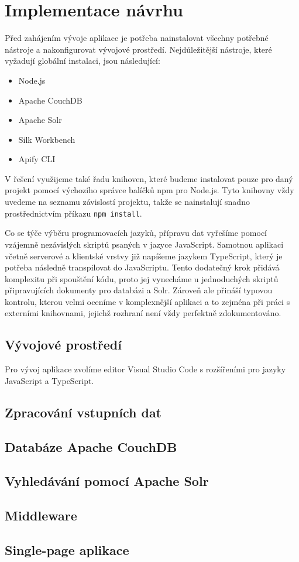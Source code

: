 
\chapter{Implementace návrhu}

Před zahájením vývoje aplikace je potřeba nainstalovat všechny potřebné nástroje a nakonfigurovat vývojové prostředí. Nejdůležitější nástroje, které vyžadují globální instalaci, jsou následující:

\begin{itemize}
    \item Node.js
    \item Apache CouchDB
    \item Apache Solr
    \item Silk Workbench
    \item Apify CLI
\end{itemize}

V řešení využijeme také řadu knihoven, které budeme instalovat pouze pro daný projekt pomocí výchozího správce balíčků npm pro Node.js. Tyto knihovny vždy uvedeme na seznamu závislostí projektu, takže se nainstalují snadno prostřednictvím příkazu \texttt{npm install}.

Co se týče výběru programovacích jazyků, přípravu dat vyřešíme pomocí vzájemně nezávislých skriptů psaných v jazyce JavaScript. Samotnou aplikaci včetně serverové a klientské vrstvy již napíšeme jazykem TypeScript, který je potřeba následně transpilovat do JavaScriptu. Tento dodatečný krok přidává komplexitu při spouštění kódu, proto jej vynecháme u jednoduchých skriptů připravujících dokumenty pro databázi a Solr. Zároveň ale přináší typovou kontrolu, kterou velmi oceníme v komplexnější aplikaci a to zejména při práci s externími knihovnami, jejichž rozhraní není vždy perfektně zdokumentováno.

\section{Vývojové prostředí}

Pro vývoj aplikace zvolíme editor Visual Studio Code s rozšířeními pro jazyky JavaScript a TypeScript. 

\section{Zpracování vstupních dat}


\section{Databáze Apache CouchDB}


\section{Vyhledávání pomocí Apache Solr}


\section{Middleware}


\section{Single-page aplikace}